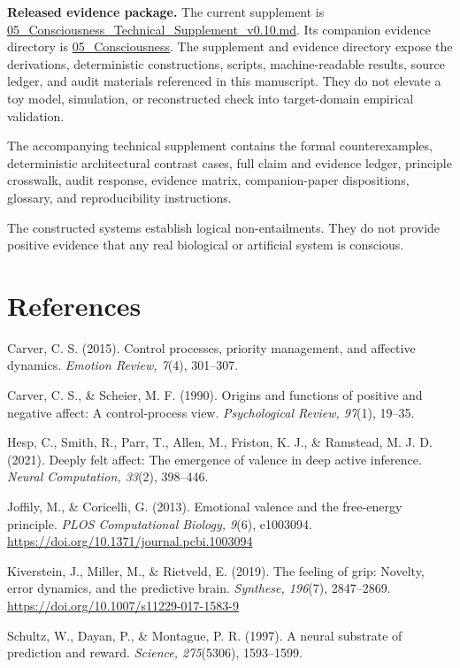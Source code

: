 \documentclass[
  11pt,
]{article}
\begin{document}
\textbf{Released evidence package.} The current supplement is
\href{../supplements/05_Consciousness_Technical_Supplement_v0.10.md}{05\_Consciousness\_Technical\_Supplement\_v0.10.md}.
Its companion evidence directory is
\href{../evidence/05_Consciousness/README.md}{05\_Consciousness}. The
supplement and evidence directory expose the derivations, deterministic
constructions, scripts, machine-readable results, source ledger, and
audit materials referenced in this manuscript. They do not elevate a toy
model, simulation, or reconstructed check into target-domain empirical
validation.

The accompanying technical supplement contains the formal
counterexamples, deterministic architectural contrast cases, full claim
and evidence ledger, principle crosswalk, audit response, evidence
matrix, companion-paper dispositions, glossary, and reproducibility
instructions.

The constructed systems establish logical non-entailments. They do not
provide positive evidence that any real biological or artificial system
is conscious.

\section{References}\label{references}

Carver, C. S. (2015). Control processes, priority management, and
affective dynamics. \emph{Emotion Review, 7}(4), 301--307.

Carver, C. S., \& Scheier, M. F. (1990). Origins and functions of
positive and negative affect: A control-process view.
\emph{Psychological Review, 97}(1), 19--35.

Hesp, C., Smith, R., Parr, T., Allen, M., Friston, K. J., \& Ramstead,
M. J. D. (2021). Deeply felt affect: The emergence of valence in deep
active inference. \emph{Neural Computation, 33}(2), 398--446.

Joffily, M., \& Coricelli, G. (2013). Emotional valence and the
free-energy principle. \emph{PLOS Computational Biology, 9}(6),
e1003094. \url{https://doi.org/10.1371/journal.pcbi.1003094}

Kiverstein, J., Miller, M., \& Rietveld, E. (2019). The feeling of grip:
Novelty, error dynamics, and the predictive brain. \emph{Synthese,
196}(7), 2847--2869. \url{https://doi.org/10.1007/s11229-017-1583-9}

Schultz, W., Dayan, P., \& Montague, P. R. (1997). A neural substrate of
prediction and reward. \emph{Science, 275}(5306), 1593--1599.
\end{document}
